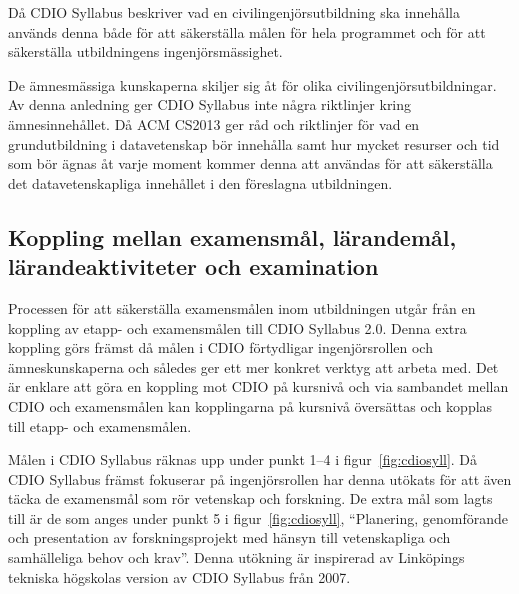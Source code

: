 Då CDIO Syllabus beskriver vad en civilingenjörsutbildning ska innehålla används denna både för att säkerställa målen för hela programmet och för att säkerställa utbildningens ingenjörsmässighet.

De ämnesmässiga kunskaperna skiljer sig åt för olika civilingenjörsutbildningar. Av denna anledning ger CDIO Syllabus inte några riktlinjer kring ämnesinnehållet. Då ACM CS2013 ger råd och riktlinjer för vad en grundutbildning i datavetenskap bör innehålla samt hur mycket resurser och tid som bör ägnas åt varje moment kommer denna att användas för att säkerställa det datavetenskapliga innehållet i den föreslagna utbildningen.

\subsection{Koppling mellan examensmål, lärandemål, lärandeaktiviteter och examination}

Processen för att säkerställa examensmålen inom utbildningen utgår från en koppling av etapp- och examensmålen till CDIO Syllabus 2.0. Denna extra koppling görs främst då målen i CDIO förtydligar ingenjörsrollen och ämneskunskaperna och således ger ett mer konkret verktyg att arbeta med. Det är enklare att göra en koppling mot CDIO på kursnivå och via sambandet mellan CDIO och examensmålen kan kopplingarna på kursnivå översättas och kopplas till etapp- och examensmålen.

Målen i CDIO Syllabus räknas upp under punkt 1--4 i figur~\ref{fig:cdiosyll}. Då CDIO Syllabus främst fokuserar på ingenjörsrollen har denna utökats för att även täcka de examensmål som rör vetenskap och forskning. De extra mål som lagts till är de som anges under punkt 5 i figur~\ref{fig:cdiosyll}, ``Planering, genomförande och presentation av forskningsprojekt med hänsyn till vetenskapliga och samhälleliga behov och krav''. Denna utökning är inspirerad av Linköpings tekniska högskolas version av CDIO Syllabus från 2007.

